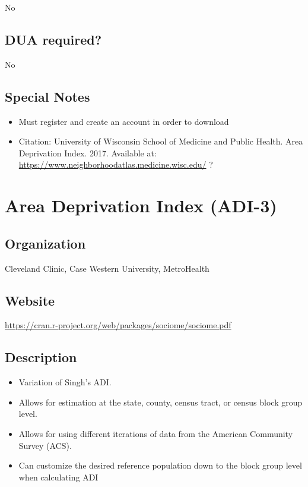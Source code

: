 \documentclass[
]{book}
\providecommand{\tightlist}{%
  \setlength{\itemsep}{0pt}\setlength{\parskip}{0pt}}
\begin{document}
No

\hypertarget{dua-required-9}{%
\section{DUA required?}\label{dua-required-9}}

No

\hypertarget{special-notes-9}{%
\section{Special Notes}\label{special-notes-9}}

\begin{itemize}
\tightlist
\item
  Must register and create an account in order to download
\item
  Citation: University of Wisconsin School of Medicine and Public Health. Area Deprivation Index. 2017. Available at: \url{https://www.neighborhoodatlas.medicine.wisc.edu/} ?
\end{itemize}

\mainmatter

\hypertarget{area-deprivation-index-adi-3}{%
\chapter{Area Deprivation Index (ADI-3)}\label{area-deprivation-index-adi-3}}

\hypertarget{organization-10}{%
\section{Organization}\label{organization-10}}

Cleveland Clinic, Case Western University, MetroHealth

\hypertarget{website-10}{%
\section{Website}\label{website-10}}

\url{https://cran.r-project.org/web/packages/sociome/sociome.pdf}

\hypertarget{description-10}{%
\section{Description}\label{description-10}}

\begin{itemize}
\tightlist
\item
  Variation of Singh's ADI.
\item
  Allows for estimation at the state, county, census tract, or census block group level.
\item
  Allows for using different iterations of data from the American Community Survey (ACS).
\item
  Can customize the desired reference population down to the block group level when calculating ADI
\end{itemize}
\end{document}
